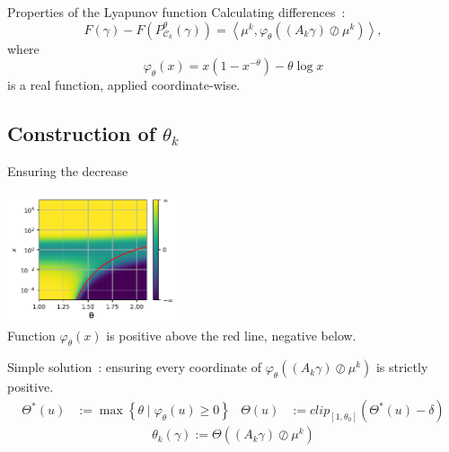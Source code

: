 \documentclass[compress]{beamer}
\newcommand{\scal}[2]{\left\langle #1 , #2 \right\rangle}
\DeclareMathOperator{\Ccal}{\mathcal{C}}
\begin{document}
\begin{frame}{Properties of the Lyapunov function}
Calculating differences~:
\begin{equation} \label{eq:kl_diff_scal}
F(\gamma) - F(P^\theta_{\Ccal_k}(\gamma)) = 
\scal{\mu^k}{\varphi_\theta \left((A_k \gamma) \oslash \mu^k \right)},
\end{equation}
where
\begin{equation}
\varphi_\theta(x) = x(1-x^{-\theta}) - \theta \log x
\end{equation}
is a real function, applied coordinate-wise.
\end{frame}

\subsection{Construction of $\theta_k$}
\begin{frame}{Ensuring the decrease}
\begin{center}
	\includegraphics[width=5cm]{images/cvgce_zone_2.png}\\
	Function $\varphi_\theta(x)$ is positive above the red line, negative below.
\end{center}
\pause
Simple solution~: ensuring every coordinate of $\varphi_\theta \left((A_k \gamma) \oslash \mu^k \right)$ is strictly positive.
\pause
\begin{align*}
\Theta^*(u) &:= \max \left\{\theta \mid \varphi_\theta(u) \ge 0 \right\}
&
\Theta(u) &:= clip_{[1,\theta_0]}(\Theta^*(u)-\delta)
\end{align*}
\[
\theta_k (\gamma) := \Theta((A_k \gamma) \oslash \mu^k)
\]
\end{frame}
\end{document}
